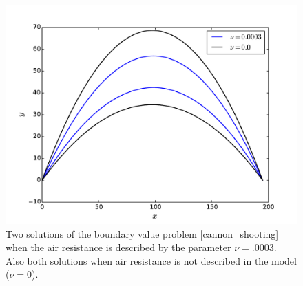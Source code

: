 \begin{figure}[ht]
\centering
\includegraphics[width=\textwidth]{Cannon_Shooting.pdf}
\caption{Two solutions of the boundary value problem \eqref{cannon_shooting} when the air resistance is described by the parameter $\nu = .0003$. Also both solutions when air resistance is not described in the model ($\nu = 0$).}
\label{shooting:cannon_comparison}
\end{figure}





